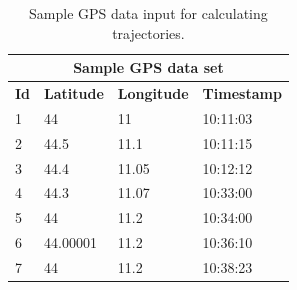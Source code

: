 \begin{table}[]
  \centering
  \begin{tabular}{|l|l|l|l|}
    \hline
    \multicolumn{4}{|c|}{\textbf{Sample GPS data set}}           \\ \hline
    \textbf{Id} & \textbf{Latitude} & \textbf{Longitude} & \textbf{Timestamp} \\ \hline
    1 & 44              & 11         & 10:11:03    \\ \hline
    2 & 44.5            & 11.1       & 10:11:15    \\ \hline
    3 & 44.4            & 11.05      & 10:12:12    \\ \hline
    4 & 44.3            & 11.07      & 10:33:00    \\ \hline
    5 & 44              & 11.2       & 10:34:00    \\ \hline
    6 & 44.00001        & 11.2       & 10:36:10    \\ \hline
    7 & 44              & 11.2       & 10:38:23    \\ \hline
  \end{tabular}
    \caption{Sample GPS data input for calculating trajectories.}
  \label{algo-input}
\end{table}

